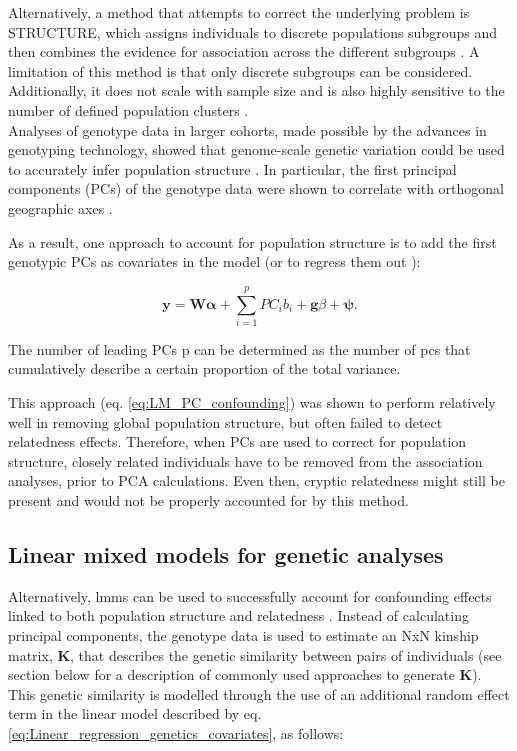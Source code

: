 Alternatively, a method that attempts to correct the underlying problem is STRUCTURE, which assigns individuals to discrete populations subgroups and then combines the evidence for association across the different subgroups \cite{pritchard2000inference}. 
A limitation of this method is that only discrete subgroups can be considered. 
Additionally, it does not scale with sample size and is also highly sensitive to the number of defined population clusters \cite{price2006principal}.\\


Analyses of genotype data in larger cohorts, made possible by the advances in
genotyping technology, showed that genome-scale genetic variation could be used to
accurately infer population structure 
\cite{li2008worldwide, tian2008analysis, price2008discerning}.
In particular, the first principal components (PCs) of the genotype data were shown to correlate with orthogonal geographic axes
\cite{novembre2008interpreting}.

As a result, one approach to account for population structure is to add the first genotypic PCs as covariates in the model (or to regress them out \cite{price2006principal}): 

\begin{equation}\label{eq:LM_PC_confounding}
    \mathbf{y} =  \mathbf{W}\boldsymbol{\alpha} + \sum_{i=1}^{p} PC_i b_i + \mathbf{g}\beta + \boldsymbol{\psi}. 
\end{equation}

The number of leading PCs p can be determined as the number of \gls{pc}s that cumulatively describe a certain proportion of the total variance.

This approach (eq. \eqref{eq:LM_PC_confounding}) was shown to perform relatively well in removing global population structure, but often failed to detect relatedness effects.
Therefore, when PCs are used to correct for population structure, closely related individuals have to be removed from the association analyses, prior to PCA calculations.
Even then, cryptic relatedness might still be present and would not be properly accounted for by this method. 

\subsection{Linear mixed models for genetic analyses}
\label{sec:LMM}

Alternatively, \gls{lmm}s can be used to successfully account for confounding effects linked to both population structure and relatedness 
\cite{yu2006unified, kang2008efficient,kang2010variance, price2010new, zhou2012genome}.
Instead of calculating principal components, the genotype data is used to estimate an NxN kinship matrix, $\mathbf{K}$, that describes the genetic similarity between pairs of individuals (see section below for a description of commonly used approaches to generate $\mathbf{K}$). 
This genetic similarity is modelled through the use of an additional random
effect term in the linear model described by eq. \eqref{eq:Linear_regression_genetics_covariates}, as follows:

